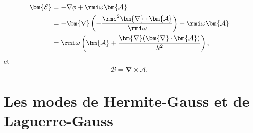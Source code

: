 \begin{align}
\bm{\mathcal{E}}&=-\nabla\phi +\rmi\omega\bm{\mathcal{A}}\\
&=-\bm{\nabla}\left(-\frac{\rmc^2\bm{\nabla}\cdot\bm{\mathcal{A}}}{\rmi \omega}\right)+\rmi\omega\bm{\mathcal{A}}\\
&=\rmi\omega\left(\bm{\mathcal{A}}+\frac{\bm{\nabla}(\bm{\nabla}\cdot\bm{\mathcal{A}})}{k^2}\right),
\label{eq:para14}
\end{align}
et 
\begin{equation}
\bm{\mathcal{B}} = \bm{\nabla}\times\bm{\mathcal{A}}.
\label{eq:para15}
\end{equation}

\section{Les modes de Hermite-Gauss et de Laguerre-Gauss}
